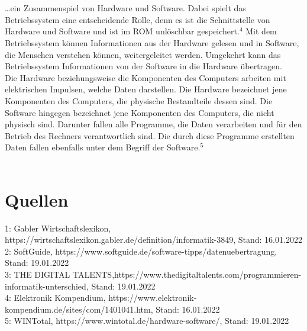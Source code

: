 \documentclass[12pt]{scrartcl}
\begin{document}
	\\ \\
	…ein Zusammenspiel von Hardware und Software. Dabei spielt das Betriebssystem eine entscheidende Rolle, denn es ist die Schnittstelle von Hardware und Software und ist im ROM unlöschbar gespeichert.$^4$ Mit dem Betriebssystem können Informationen aus der Hardware gelesen und in Software, die Menschen verstehen können, weitergeleitet werden. Umgekehrt kann das Betriebssystem Informationen von der Software in die Hardware übertragen.\\
	Die Hardware beziehungsweise die Komponenten des Computers arbeiten mit elektrischen Impulsen, welche Daten darstellen. Die Hardware bezeichnet jene Komponenten des Computers, die physische Bestandteile dessen sind. Die Software hingegen bezeichnet jene Komponenten des Computers, die nicht physisch sind. Darunter fallen alle Programme, die Daten verarbeiten und für den Betrieb des Rechners verantwortlich sind. Die durch diese Programme erstellten Daten fallen ebenfalls unter dem Begriff der Software.$^5$
\\ \\
\section*{Quellen}
	1: Gabler Wirtschaftslexikon, https://wirtschaftslexikon.gabler.de/definition/informatik-3849, Stand: 16.01.2022\\
	2: SoftGuide, https://www.softguide.de/software-tipps/datenuebertragung, Stand: 19.01.2022\\
	3: THE DIGITAL TALENTS,https://www.thedigitaltalents.com/programmieren-informatik-unterschied, Stand: 19.01.2022\\
	4: Elektronik Kompendium, https://www.elektronik-kompendium.de/sites/com/1401041.htm, Stand: 16.01.2022\\
	5: WINTotal, https://www.wintotal.de/hardware-software/, Stand: 19.01.2022
\end{document}
